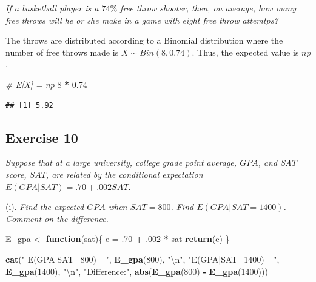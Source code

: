 \documentclass[
]{article}
\newenvironment{Shaded}{\begin{snugshade}}{\end{snugshade}}
\newcommand{\CharTok}[1]{\textcolor[rgb]{0.31,0.60,0.02}{#1}}
\newcommand{\CommentTok}[1]{\textcolor[rgb]{0.56,0.35,0.01}{\textit{#1}}}
\newcommand{\ControlFlowTok}[1]{\textcolor[rgb]{0.13,0.29,0.53}{\textbf{#1}}}
\newcommand{\DecValTok}[1]{\textcolor[rgb]{0.00,0.00,0.81}{#1}}
\newcommand{\FloatTok}[1]{\textcolor[rgb]{0.00,0.00,0.81}{#1}}
\newcommand{\KeywordTok}[1]{\textcolor[rgb]{0.13,0.29,0.53}{\textbf{#1}}}
\newcommand{\NormalTok}[1]{#1}
\newcommand{\OperatorTok}[1]{\textcolor[rgb]{0.81,0.36,0.00}{\textbf{#1}}}
\newcommand{\StringTok}[1]{\textcolor[rgb]{0.31,0.60,0.02}{#1}}
\begin{document}
\textit{If a basketball player is a $74\%$ free throw shooter, then, on average, how many free throws will he or she make in a game with eight free throw attemtps?}

The throws are distributed according to a Binomial distribution where
the number of free throws made is \(X\sim Bin(8, 0.74)\). Thus, the
expected value is \(np\).

\begin{Shaded}
\begin{Highlighting}[]
\CommentTok{# E[X] = np }
\DecValTok{8} \OperatorTok{*}\StringTok{ }\FloatTok{0.74}
\end{Highlighting}
\end{Shaded}

\begin{verbatim}
## [1] 5.92
\end{verbatim}

\hypertarget{exercise-10}{%
\subsection{Exercise 10}\label{exercise-10}}

\textit{Suppose that at a large university, college grade point average, $GPA$, and SAT score, $SAT$, are related by the conditional expectation $E(GPA|SAT) = .70 + .002SAT.$}

(i).
\textit{Find the expected $GPA$ when $SAT = 800$. Find $E(GPA|SAT=1400)$. Comment on the difference.}

\begin{Shaded}
\begin{Highlighting}[]
\NormalTok{E_gpa <-}\StringTok{ }\ControlFlowTok{function}\NormalTok{(sat)\{}
\NormalTok{  e =}\StringTok{ }\FloatTok{.70} \OperatorTok{+}\StringTok{ }\FloatTok{.002} \OperatorTok{*}\StringTok{ }\NormalTok{sat}
  \KeywordTok{return}\NormalTok{(e)}
\NormalTok{\}}
\end{Highlighting}
\end{Shaded}

\begin{Shaded}
\begin{Highlighting}[]
\KeywordTok{cat}\NormalTok{(}\StringTok{" E(GPA|SAT=800) ="}\NormalTok{, }\KeywordTok{E_gpa}\NormalTok{(}\DecValTok{800}\NormalTok{), }\StringTok{"}\CharTok{\textbackslash{}n}\StringTok{"}\NormalTok{,}
    \StringTok{"E(GPA|SAT=1400) ="}\NormalTok{, }\KeywordTok{E_gpa}\NormalTok{(}\DecValTok{1400}\NormalTok{), }\StringTok{"}\CharTok{\textbackslash{}n}\StringTok{"}\NormalTok{, }
    \StringTok{"Difference:"}\NormalTok{, }\KeywordTok{abs}\NormalTok{(}\KeywordTok{E_gpa}\NormalTok{(}\DecValTok{800}\NormalTok{) }\OperatorTok{-}\StringTok{ }\KeywordTok{E_gpa}\NormalTok{(}\DecValTok{1400}\NormalTok{)))}
\end{Highlighting}
\end{Shaded}
\end{document}
